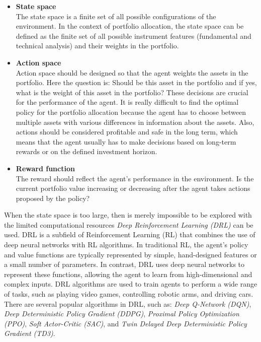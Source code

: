 \documentclass[../xlapes02]{subfiles}
\begin{document}
    \begin{itemize}
        \item \textbf{State space}\\ The state space is a finite set of all possible configurations of the environment. In the context of portfolio allocation, the state space can be defined as the finite set of all possible instrument features (fundamental and technical analysis) and their weights in the portfolio.
        \item \textbf{Action space} \\ Action space should be designed so that the agent weights the assets in the portfolio. Here the question is: Should be this asset in the portfolio and if yes, what is the weight of this asset in the portfolio? These decisions are crucial for the performance of the agent. It is really difficult to find the optimal policy for the portfolio allocation because the agent has to choose between multiple assets with various differences in information about the assets. Also, actions should be considered profitable and safe in the long term, which means that the agent usually has to make decisions based on long-term rewards or on the defined investment horizon.
        \item \textbf{Reward function}\\ The reward should reflect the agent's performance in the environment. Is the current portfolio value increasing or decreasing after the agent takes actions proposed by the policy?
    \end{itemize}

    When the state space is too large, then is merely impossible to be explored with the limited computational resources \emph{Deep Reinforcement Learning (DRL)} can be used. DRL is a subfield of Reinforcement Learning (RL) that combines the use of deep neural networks with RL algorithms. In traditional RL, the agent's policy and value functions are typically represented by simple, hand-designed features or a small number of parameters. In contrast, DRL uses deep neural networks to represent these functions, allowing the agent to learn from high-dimensional and complex inputs. DRL algorithms are used to train agents to perform a wide range of tasks, such as playing video games, controlling robotic arms, and driving cars. There are several popular algorithms in DRL, such as: \emph{Deep Q-Network (DQN)}, \emph{Deep Deterministic Policy Gradient (DDPG)}, \emph{Proximal Policy Optimization (PPO)}, \emph{Soft Actor-Critic (SAC)}, and \emph{Twin Delayed Deep Deterministic Policy Gradient (TD3)}.
\end{document}
